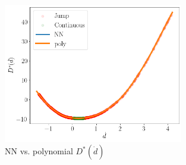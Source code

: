 \begin{figure}[H]
    \centering
    \includegraphics[width=0.7\textwidth]{images/Trial0216_combined_800_D_star_polyerr.png}
    \caption{NN vs. polynomial $D^*(\dot{d})$}
\end{figure}

